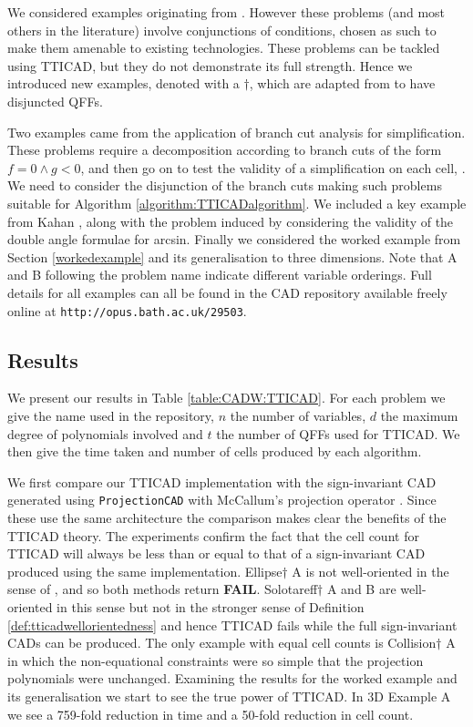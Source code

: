 \documentclass{article}
\begin{document}
We considered examples originating from \cite{BuchbergerHong1991}.  However these problems (and most others in the literature) involve conjunctions of conditions, chosen as such to make them amenable to existing technologies.
These problems can be tackled using TTICAD, but they do not demonstrate its full strength. Hence we introduced new examples, denoted with a $\dagger$, which are adapted from \cite{BuchbergerHong1991} to have disjuncted QFFs.

Two examples came from the application of branch cut analysis for simplification.  These problems require a decomposition according to branch cuts of the form $f = 0 \land g < 0$, and then go on to test the validity of a simplification on each cell, \cite[etc.]{Phisanbutetal2010a}.  We need to consider the disjunction of the branch cuts making such problems suitable for Algorithm \ref{algorithm:TTICADalgorithm}.  We included a key example from Kahan \cite{Kahan1987b}, along with the problem induced by considering the validity of the double angle formulae for arcsin.  Finally we considered the worked example from Section \ref{workedexample} and its generalisation to three dimensions.
Note that A and B following the problem name indicate different variable orderings.  Full details for all examples can all be found in the CAD repository \cite{Wilsonetal2012b}
available freely online at \texttt{http://opus.bath.ac.uk/29503}.
 
\subsection{Results}

We present our results in Table \ref{table:CADW:TTICAD}.  For each problem we give the name used in the repository, $n$ the number of variables, $d$ the maximum degree of polynomials involved and $t$ the number of QFFs used for TTICAD.  We then give the time taken and number of cells produced by each algorithm.  

We first compare our TTICAD implementation with the sign-invariant CAD generated using \texttt{ProjectionCAD} with McCallum's projection operator \cite{ProjectionCAD}.  Since these use the same architecture the comparison makes clear the benefits of the TTICAD theory.  The experiments confirm the fact that  
the cell count for TTICAD will always be less than or equal to that of a sign-invariant CAD produced using the same implementation.  Ellipse$\dagger$ A is not well-oriented in the sense of \cite{McCallum1998}, and so both methods return {\bf FAIL}.  Solotareff$\dagger$ A and B are well-oriented in this sense but not in the stronger sense of Definition \ref{def:tticadwellorientedness} and hence TTICAD fails while the full sign-invariant CADs can be produced.  The only example with equal cell counts is Collision$\dagger$ A in which the non-equational constraints were so simple that the projection polynomials were unchanged.  Examining the results for the worked example and its generalisation we start to see the true power of TTICAD. In 3D Example A we see a 759-fold reduction in time and a 50-fold reduction in cell count. 
\end{document}
